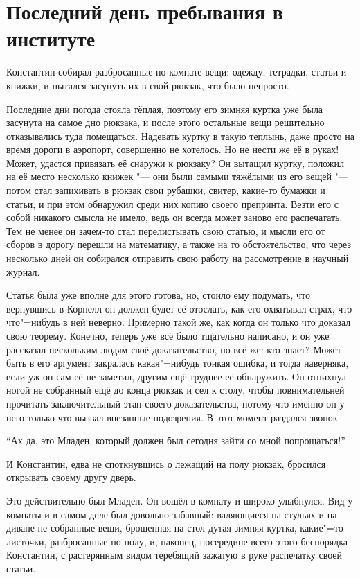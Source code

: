 \section{Последний день пребывания в институте}

Константин собирал разбросанные по комнате вещи: одежду, тетрадки, статьи и
книжки, и пытался засунуть их в свой рюкзак, что было непросто.

Последние дни погода стояла тёплая, поэтому его зимняя куртка уже была засунута
на самое дно рюкзака, и после этого остальные вещи решительно отказывались туда
помещаться.
Надевать куртку в такую теплынь, даже просто на время дороги в аэропорт,
совершенно не хотелось.
Но не нести же её в руках!
Может, удастся привязать её снаружи к рюкзаку?
Он вытащил куртку, положил на её место несколько книжек "--- они были самыми
тяжёлыми из его вещей "--- потом стал запихивать в рюкзак свои рубашки, свитер,
какие-то бумажки и статьи, и при этом обнаружил среди них копию своего препринта.
Везти его с собой никакого смысла не имело, ведь он всегда может заново его
распечатать.
Тем не менее он зачем-то стал перелистывать свою статью, и мысли его от сборов в
дорогу перешли на математику, а также на то обстоятельство, что через несколько
дней он собирался отправить свою работу на рассмотрение в научный журнал.

Статья была уже вполне для этого готова, но, стоило ему подумать, что вернувшись
в Корнелл он должен будет её отослать, как его охватывал страх, что что"=нибудь
в ней неверно.
Примерно такой же, как когда он только что доказал свою теорему.
Конечно, теперь уже всё было тщательно написано, и он уже рассказал нескольким
людям своё доказательство, но всё же: кто знает?
Может быть в его аргумент закралась какая"=нибудь тонкая ошибка, и тогда
наверняка, если уж он сам её не заметил, другим ещё труднее её обнаружить.
Он отпихнул ногой не собранный ещё до конца рюкзак и сел к столу, чтобы
повнимательней прочитать заключительный этап своего доказательства, потому что
именно он у него только что вызвал внезапные подозрения.
В этот момент раздался звонок.

\enquote{Ах да, это Младен, который должен был сегодня зайти со мной попрощаться!}

И Константин, едва не споткнувшись о лежащий на полу рюкзак, бросился открывать
своему другу дверь.

Это действительно был Младен.
Он вошёл в комнату и широко улыбнулся.
Вид у комнаты и в самом деле был довольно забавный: валяющиеся на стульях и на
диване не собранные вещи, брошенная на стол дутая зимняя куртка, какие"=то
листочки, разбросанные по полу, и, наконец, посередине всего этого беспорядка
Константин, с растерянным видом теребящий зажатую в руке распечатку своей статьи.

